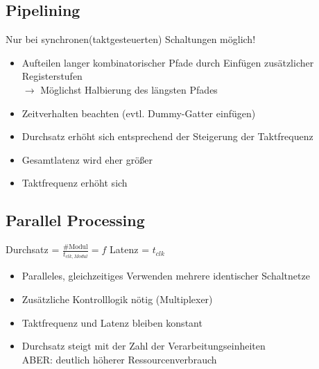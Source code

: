 \documentclass[6pt,a4paper]{scrartcl}
\newcommand{\ra}[0]{\ensuremath{\rightarrow}} 									%
\begin{document}
\begin{multicols}{3}
\subsection{Pipelining} %
Nur bei synchronen(taktgesteuerten) Schaltungen möglich!
\begin{itemize} \itemsep0pt
	\item Aufteilen langer kombinatorischer Pfade durch Einfügen zusätzlicher Registerstufen\\
	$\ra$ Möglichst Halbierung des längsten Pfades
	\item Zeitverhalten beachten (evtl. Dummy-Gatter einfügen)
	\item Durchsatz erhöht sich entsprechend der Steigerung der Taktfrequenz
	\item Gesamtlatenz wird eher größer
	\item Taktfrequenz erhöht sich
\end{itemize}

\subsection{Parallel Processing} %

Durchsatz = $\frac{\#\text{Modul}}{t_{clk,Modul}} = f$ \qquad \quad Latenz = $t_{clk}$
\begin{itemize} \itemsep0pt
	\item Paralleles, gleichzeitiges Verwenden mehrere identischer Schaltnetze
	\item Zusätzliche Kontrolllogik nötig (Multiplexer)
	\item Taktfrequenz und Latenz bleiben konstant
	\item Durchsatz steigt mit der Zahl der Verarbeitungseinheiten \\
	ABER: deutlich höherer Ressourcenverbrauch
\end{itemize}


\end{multicols}
\end{document}

